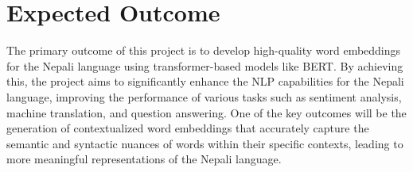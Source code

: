 \chapter{Expected Outcome}
\noindent
The primary outcome of this project is to develop high-quality word embeddings for the Nepali language using transformer-based models like BERT. By achieving this, the project aims to significantly enhance the NLP capabilities for the Nepali language, improving the performance of various tasks such as sentiment analysis, machine translation, and question answering. One of the key outcomes will be the generation of contextualized word embeddings that accurately capture the semantic and syntactic nuances of words within their specific contexts, leading to more meaningful representations of the Nepali language.
